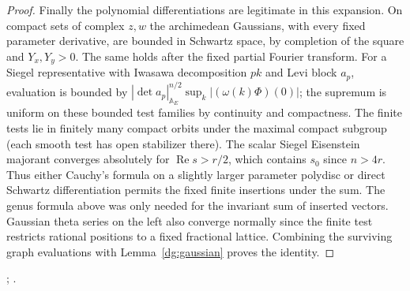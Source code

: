 \begin{proof}
Finally the polynomial differentiations are legitimate in this
expansion. On compact sets of complex $z,w$ the archimedean
Gaussians, with every fixed parameter derivative, are bounded in
Schwartz space, by completion of the square and $Y_x,Y_y>0$.
The same holds after the fixed partial Fourier transform.
For a Siegel representative with Iwasawa decomposition $pk$ and
Levi block $a_p$, evaluation is bounded by
$|\det a_p|_{\mathbb A_E}^{n/2}
\sup_k|(\omega(k)\Phi)(0)|$; the supremum is uniform on these
bounded test families by continuity and compactness. The finite
tests lie in finitely many compact orbits under the maximal compact
subgroup (each smooth test has open stabilizer there).
The scalar Siegel Eisenstein majorant converges absolutely for
$\operatorname{Re}s>r/2$, which contains $s_0$ since $n>4r$.
Thus either Cauchy's formula on a slightly larger parameter
polydisc or direct Schwartz differentiation permits the fixed
finite insertions under the sum. The genus formula above was only
needed for the invariant sum of inserted vectors. Gaussian theta
series on the left also converge normally since the finite test
restricts rational positions to a fixed fractional lattice.
Combining the surviving graph evaluations with Lemma~\ref{dg:gaussian}
proves the identity.
\end{proof}

;
.
